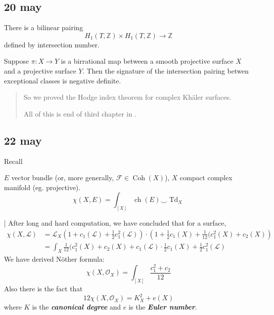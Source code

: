 \documentclass{article}
\newcommand{\Z}{\mathbb{Z}}
\newcommand{\Fc}{\mathcal{F}}
\newcommand{\Lc}{\mathcal{L}}
\newcommand{\Oc}{\mathcal{O}}
\DeclareMathOperator{\Td}{Td}
\DeclareMathOperator{\Coh}{Coh}
\DeclareMathOperator{\ch}{ch}
\begin{document}
\subsection{20 may}
There is a bilinear pairing
\[H_1(T,\Z)\times H_1(T,\Z)\to\Z\]
defined by intersection number.

\begin{thm}
	Suppose $\pi:X\to Y$ is a birrational map between a smooth projective surface $X$ and a projective surface $Y$. Then the signature of the intersection pairing betwen exceptional classes is negative definite.
\end{thm}
\begin{quotation}
	So we proved the Hodge index theorem for complex Khäler surfaces.
	
	All of this is end of third chapter in \cite{huybrechts}.
\end{quotation}
\subsection{22 may}
Recall
\begin{thm}
	$E$ vector bundle (or, more generally, $\Fc\in\Coh(X)$), $X$ compact complex manifold (eg. projective).
	\[\chi(X,E)=\int_{[X]}\ch(E)\smile \Td_X\]
\end{thm}|
After long and hard computation, we have concluded that for a surface,
\begin{align*}
	\chi(X,\Lc)&=\Lc_X(1+c_1(\Lc)+\frac{1}{2}c_1^2(\Lc))\cdot\left(1+\frac{1}{2}c_1(X)+\frac{1}{12}(c_1^2(X)+c_2(X)\right)\\
	&=\int_X\frac{1}{12}(c_1^2(X)+c_2(X)+c_1(\Lc)\cdot\frac{1}{2}c_1(X)+\frac{1}{2}c_1^2(\Lc)
\end{align*}
We have derived Nöther formula:
\[\chi(X,\Oc_X)=\int_{[X]}\frac{c_1^2+c_2}{12}\]
Also there is the fact that
\[12\chi(X,\Oc_X)=K_X^2+e(X)\]
where $K$ is the \textbf{\textit{canonical degree}} and $e$ is the \textbf{\textit{Euler number}}.
\end{document}
